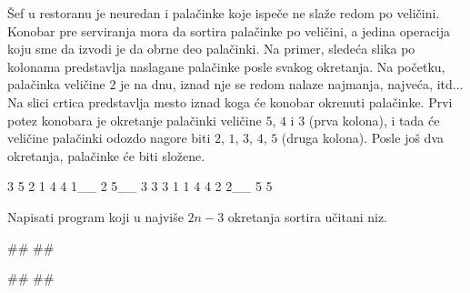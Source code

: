 \begin{Exercise}[difficulty=1, label=3_27]
  Šef u restoranu je neuredan i palačinke koje ispeče ne slaže redom
  po veličini. Konobar pre serviranja mora da sortira palačinke po
  veličini, a jedina operacija koju sme da izvodi je da obrne deo
  palačinki. Na primer, sledeća slika po kolonama predstavlja
  naslagane palačinke posle svakog okretanja. Na početku, palačinka
  veličine $2$ je na dnu, iznad nje se redom nalaze najmanja, najveća,
  itd... Na slici crtica predstavlja mesto iznad koga će konobar
  okrenuti palačinke. Prvi potez konobara je okretanje palačinki
  veličine $5$, $4$ i $3$ (prva kolona), i tada će veličine palačinki
  odozdo nagore biti $2$, $1$, $3$, $4$, $5$ (druga kolona). Posle još
  dva okretanja, palačinke će biti složene.
\begin{ckod}
    3    5    2    1
    4    4    1__  2
    5__  3    3    3
    1    1    4    4
    2    2__  5    5
\end{ckod}
Napisati program koji u najviše $2n-3$ okretanja sortira učitani
niz. 

\begin{maxitest}
\begin{test}{1}
#\naslovUlaz#
##

#\naslovIzlaz#
##
\end{test}
\end{maxitest}

\end{Exercise}

